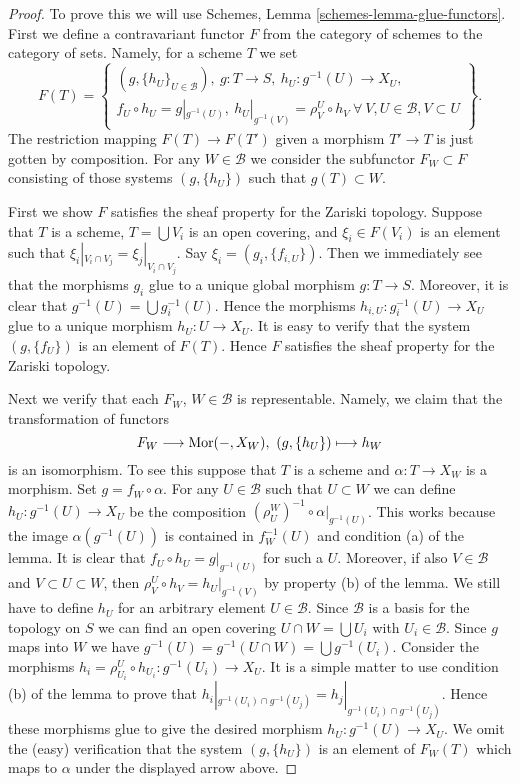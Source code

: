 \begin{proof}
To prove this we will use Schemes, Lemma \ref{schemes-lemma-glue-functors}.
First we define a contravariant functor $F$ from the category of schemes
to the category of sets. Namely, for a scheme $T$ we set
$$
F(T) =
\left\{
\begin{matrix}
(g, \{h_U\}_{U \in \mathcal{B}}), \ 
g : T \to S, \ h_U : g^{-1}(U) \to X_U, \\
f_U \circ h_U = g|_{g^{-1}(U)}, \ 
h_U|_{g^{-1}(V)} = \rho^U_V \circ h_V\ 
\forall\ V, U \in \mathcal{B}, V \subset U
\end{matrix}
\right\}.
$$
The restriction mapping $F(T) \to F(T')$ given a morphism
$T' \to T$ is just gotten by composition.
For any $W \in \mathcal{B}$ we consider the subfunctor
$F_W \subset F$ consisting of those systems $(g, \{h_U\})$
such that $g(T) \subset W$.

\medskip\noindent
First we show $F$ satisfies the sheaf property for the Zariski topology.
Suppose that $T$ is a scheme, $T = \bigcup V_i$ is an open covering,
and $\xi_i \in F(V_i)$ is an element such that
$\xi_i|_{V_i \cap V_j} = \xi_j|_{V_i \cap V_j}$.
Say $\xi_i = (g_i, \{f_{i, U}\})$. Then we immediately see that
the morphisms $g_i$ glue to a unique global morphism
$g : T \to S$. Moreover, it is clear that
$g^{-1}(U) = \bigcup g_i^{-1}(U)$. Hence the morphisms
$h_{i, U} : g_i^{-1}(U) \to X_U$ glue to a unique morphism
$h_U : U \to X_U$. It is easy to verify that the system
$(g, \{f_U\})$ is an element of $F(T)$. Hence $F$ satisfies the
sheaf property for the Zariski topology.

\medskip\noindent
Next we verify that each $F_W$, $W \in \mathcal{B}$ is representable.
Namely, we claim that the transformation of functors
$$
F_W \longrightarrow \mathop{\rm Mor}\nolimits(-, X_W), \ (g, \{h_U\}) \longmapsto h_W
$$
is an isomorphism. To see this suppose that $T$ is a scheme and
$\alpha : T \to X_W$ is a morphism. Set $g = f_W \circ \alpha$.
For any $U \in \mathcal{B}$ such that $U \subset W$ we can
define $h_U : g^{-1}(U) \to X_U$ be the composition
$(\rho^W_U)^{-1} \circ \alpha|_{g^{-1}(U)}$. This works because
the image $\alpha(g^{-1}(U))$ is contained in $f_W^{-1}(U)$ and
condition (a) of the lemma. It is clear that
$f_U \circ h_U = g|_{g^{-1}(U)}$ for such a $U$.
Moreover, if also $V \in \mathcal{B}$ and $V \subset U \subset W$,
then $\rho^U_V \circ h_V = h_U|_{g^{-1}(V)}$ by property (b)
of the lemma. We still have to define $h_U$ for an arbitrary
element $U \in \mathcal{B}$. Since $\mathcal{B}$ is a basis for
the topology on $S$ we can find an open covering
$U \cap W = \bigcup U_i$ with $U_i \in \mathcal{B}$. Since $g$ maps into $W$
we have
$g^{-1}(U) = g^{-1}(U \cap W) = \bigcup g^{-1}(U_i)$.
Consider the morphisms
$h_i = \rho^U_{U_i} \circ h_{U_i} : g^{-1}(U_i) \to X_U$.
It is a simple matter to use condition (b) of the lemma
to prove that
$h_i|_{g^{-1}(U_i) \cap g^{-1}(U_j)} = h_j|_{g^{-1}(U_i) \cap g^{-1}(U_j)}$.
Hence these morphisms glue to give the desired morphism
$h_U : g^{-1}(U) \to X_U$. We omit the (easy) verification that
the system $(g, \{h_U\})$ is an element of $F_W(T)$ which
maps to $\alpha$ under the displayed arrow above.


\end{proof}
